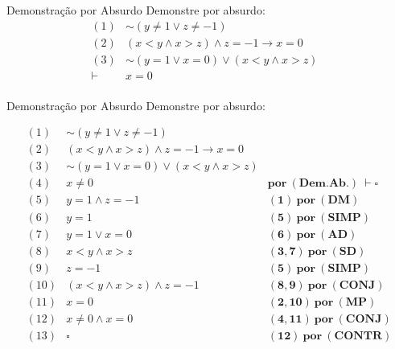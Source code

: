 \begin{frame}[t]{Demonstração por Absurdo}
	Demonstre por absurdo:
	\vskip 0.5cm
	$$\begin{array}{lll}
	(1) & \sim (y \neq 1 \vee z \neq -1)& \\
	(2) & (x < y \wedge x > z) \wedge z = -1 \rightarrow x = 0& \\
	(3) & \sim (y = 1 \vee x = 0) \vee (x < y \wedge x > z) & \\
	\hline
	\vdash & x = 0 \\
	\end{array}$$	
\end{frame}

\begin{frame}[t]{Demonstração por Absurdo}
	Demonstre por absurdo:

	$$\begin{array}{lll}
	(1) & \sim (y \neq 1 \vee z \neq -1)& \\
	(2) & (x < y \wedge x > z) \wedge z = -1 \rightarrow x = 0& \\
	(3) & \sim (y = 1 \vee x = 0) \vee (x < y \wedge x > z) & \\
	(4) & x \neq 0 & \mathbf{por~(Dem.Ab.)~} \vdash\square \\
	\hline
	(5) & y = 1 \wedge z = -1 & \mathbf{(1)~por~(DM)} \\
	(6) & y = 1 & \mathbf{(5)~por~(SIMP)} \\
	(7) & y = 1 \vee x = 0 & \mathbf{(6)~por~(AD)} \\
	(8) & x < y \wedge x > z & \mathbf{(3,7)~por~(SD)} \\
	(9) & z = -1 & \mathbf{(5)~por~(SIMP)} \\
	(10) & (x < y \wedge x > z) \wedge z = -1 & \mathbf{(8,9)~por~(CONJ)} \\
	(11) & x = 0 & \mathbf{(2,10)~por~(MP)} \\
	(12) & x \neq 0 \wedge x = 0 & \mathbf{(4,11)~por~(CONJ)} \\
	(13) & \square & \mathbf{(12)~por~(CONTR)}
	\end{array}$$	
\end{frame}
